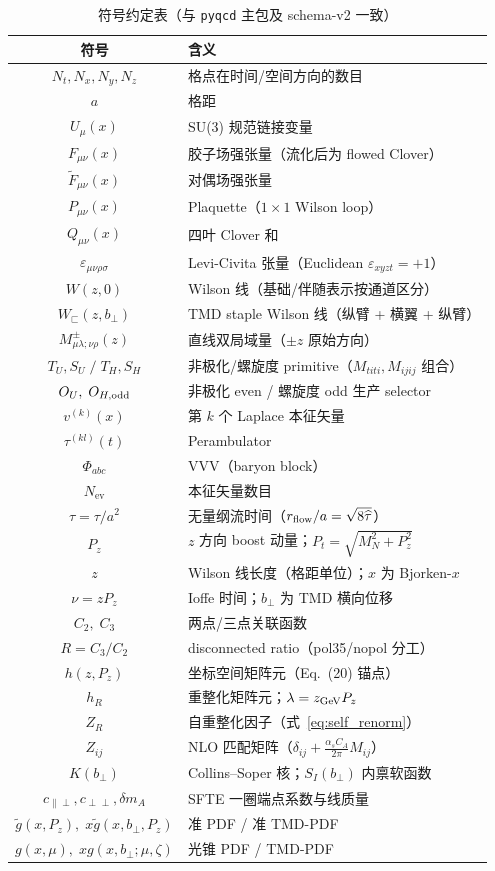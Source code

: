 \documentclass[11pt,a4paper]{ctexart}
\newcommand{\Fmunu}{F_{\mu\nu}}
\newcommand{\Ftmunu}{\tilde{F}_{\mu\nu}}
\newcommand{\eps}{\varepsilon}
\newcommand{\code}[1]{\texttt{#1}}
\newcommand{\bperp}{b_{\perp}}
\newcommand{\zzh}{\widehat{\tau}}
\begin{document}
\begin{table}[htbp]
\centering
\caption{符号约定表（与 \code{pyqcd} 主包及 schema-v2 一致）}
\small
\begin{tabular}{c l}
\toprule
\textbf{符号} & \textbf{含义} \\
\midrule
$N_t, N_x, N_y, N_z$ & 格点在时间/空间方向的数目 \\
$a$ & 格距 \\
$U_\mu(x)$ & SU(3) 规范链接变量 \\
$\Fmunu(x)$ & 胶子场强张量（流化后为 flowed Clover） \\
$\Ftmunu(x)$ & 对偶场强张量 \\
$P_{\mu\nu}(x)$ & Plaquette（$1\times1$ Wilson loop） \\
$Q_{\mu\nu}(x)$ & 四叶 Clover 和 \\
$\eps_{\mu\nu\rho\sigma}$ & Levi-Civita 张量（Euclidean $\eps_{xyzt}=+1$） \\
$W(z,0)$ & Wilson 线（基础/伴随表示按通道区分） \\
$W_\sqsubset(z,\bperp)$ & TMD staple Wilson 线（纵臂 + 横翼 + 纵臂） \\
$M_{\mu\lambda;\nu\rho}^{\pm}(z)$ & 直线双局域量（$\pm z$ 原始方向） \\
$T_U,S_U\;/\;T_H,S_H$ & 非极化/螺旋度 primitive（$M_{titi},M_{ijij}$ 组合） \\
$O_U,\;O_{H,\rm odd}$ & 非极化 even / 螺旋度 odd 生产 selector \\
$v^{(k)}(x)$ & 第 $k$ 个 Laplace 本征矢量 \\
$\tau^{(kl)}(t)$ & Perambulator \\
$\Phi_{abc}$ & VVV（baryon block） \\
$N_{\text{ev}}$ & 本征矢量数目 \\
$\zzh=\tau/a^2$ & 无量纲流时间（$r_{\rm flow}/a=\sqrt{8\zzh}$） \\
$P_z$ & $z$ 方向 boost 动量；$P_t=\sqrt{M_N^2+P_z^2}$ \\
$z$ & Wilson 线长度（格距单位）；$x$ 为 Bjorken-$x$ \\
$\nu=zP_z$ & Ioffe 时间；$\bperp$ 为 TMD 横向位移 \\
$C_2,\;C_3$ & 两点/三点关联函数 \\
$R=C_3/C_2$ & disconnected ratio（pol35/nopol 分工） \\
$h(z,P_z)$ & 坐标空间矩阵元（Eq.~(20) 锚点） \\
$h_R$ & 重整化矩阵元；$\lambda=z_{\rm GeV}P_z$ \\
$Z_R$ & 自重整化因子（式~\eqref{eq:self_renorm}） \\
$Z_{ij}$ & NLO 匹配矩阵（$\delta_{ij}+\frac{\alpha_sC_A}{2\pi}M_{ij}$） \\
$K(\bperp)$ & Collins--Soper 核；$S_I(\bperp)$ 内禀软函数 \\
$c_{\parallel\perp},c_{\perp\perp},\delta m_A$ & SFTE 一圈端点系数与线质量 \\
$\tilde{g}(x,P_z),\;x\tilde g(x,\bperp,P_z)$ & 准 PDF / 准 TMD-PDF \\
$g(x,\mu),\;xg(x,\bperp;\mu,\zeta)$ & 光锥 PDF / TMD-PDF \\
\bottomrule
\end{tabular}
\end{table}
\end{document}
